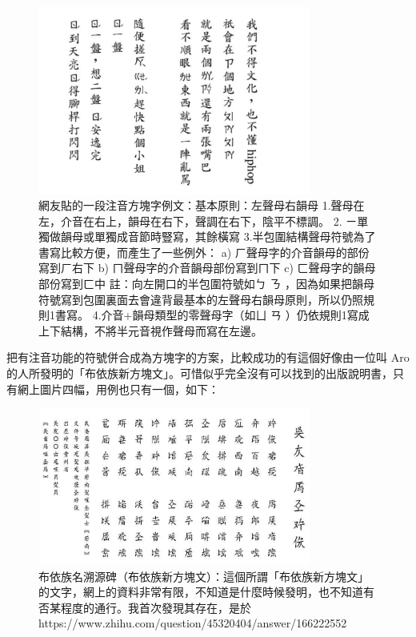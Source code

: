 \documentclass[a5paper, 10pt, openany]{book} %
\begin{document}
\begin{figure}[h]
  \centering
  \includegraphics[width=0.8\textwidth]{./images/zhuyin_composed_5.png}
  \caption{網友貼的一段注音方塊字例文：基本原則：左聲母右韻母 1.聲母在左，介音在右上，韻母在右下，聲調在右下，陰平不標調。 2. ㄧ單獨做韻母或單獨成音節時豎寫，其餘橫寫 3.半包圍結構聲母符號為了書寫比較方便，而產生了一些例外： a) ㄏ聲母字的介音韻母的部份寫到ㄏ右下 b) ㄇ聲母字的介音韻母部份寫到ㄇ下 c) ㄈ聲母字的韻母部份寫到ㄈ中 註：向左開口的半包圍符號如ㄅ ㄋ ，因為如果把韻母符號寫到包圍裏面去會違背最基本的左聲母右韻母原則，所以仍照規則1書寫。 4.介音+韻母類型的零聲母字（如ㄩ ㄢ ）仍依規則1寫成上下結構，不將半元音視作聲母而寫在左邊。}
\end{figure}


把有注音功能的符號併合成為方塊字的方案，比較成功的有這個好像由一位叫 Aro 的人所發明的「布依族新方塊文」。可惜似乎完全沒有可以找到的出版說明書，只有網上圖片四幅，用例也只有一個，如下：
 
\begin{figure}[h]
  \centering
  \includegraphics[width=0.8\textwidth]{./images/aros_buyizu_1.png}
  \caption{布依族名溯源碑（布依族新方塊文）：這個所謂「布依族新方塊文」的文字，網上的資料非常有限，不知道是什麼時候發明，也不知道有否某程度的通行。我首次發現其存在，是於https://www.zhihu.com/question/45320404/answer/166222552}
\end{figure}
\end{document}
